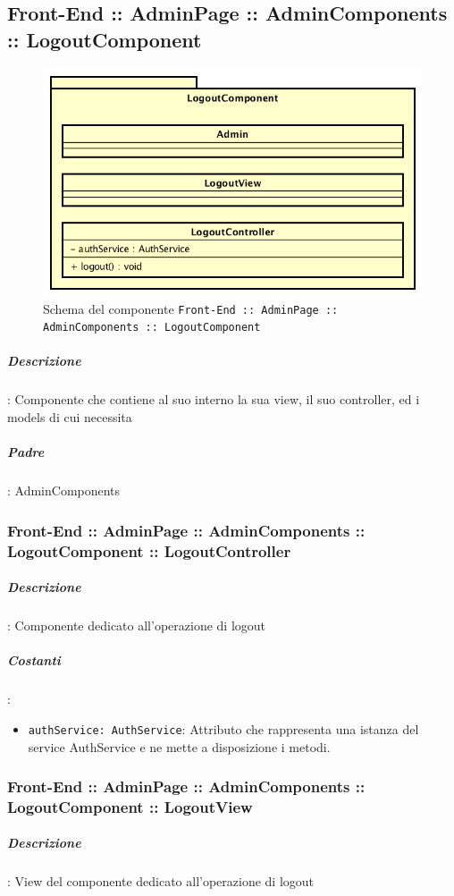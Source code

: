 \documentclass[../ManualeSviluppatore_v1.0.0.tex]{subfiles}
\begin{document}
	\subsection{Front-End :: AdminPage :: AdminComponents :: LogoutComponent}
	\begin{figure}[!h]
		\centering
		\includegraphics[scale=0.6]{Architettura/Front-End/AdminPage/AdminComponents/LogoutComponent.png}
		\caption{Schema del componente \texttt{Front-End :: AdminPage :: AdminComponents :: LogoutComponent}}
	\end{figure}

			\subparagraph{Descrizione}: Componente che contiene al suo interno la sua view, il suo controller, ed i models di cui necessita
			\subparagraph{Padre}: AdminComponents
	  		\subsubsection{Front-End :: AdminPage :: AdminComponents :: LogoutComponent :: LogoutController}
				\subparagraph{Descrizione}: Componente dedicato all'operazione di logout
				\subparagraph{Costanti}:
				\begin{itemize}
					\item \texttt{authService: AuthService}: Attributo che rappresenta una istanza del service AuthService e ne mette a disposizione i metodi.
				\end{itemize}
				\subsubsection{Front-End :: AdminPage :: AdminComponents :: LogoutComponent :: LogoutView}
				\subparagraph{Descrizione}: View del componente dedicato all'operazione di logout

	\newpage
\end{document}
